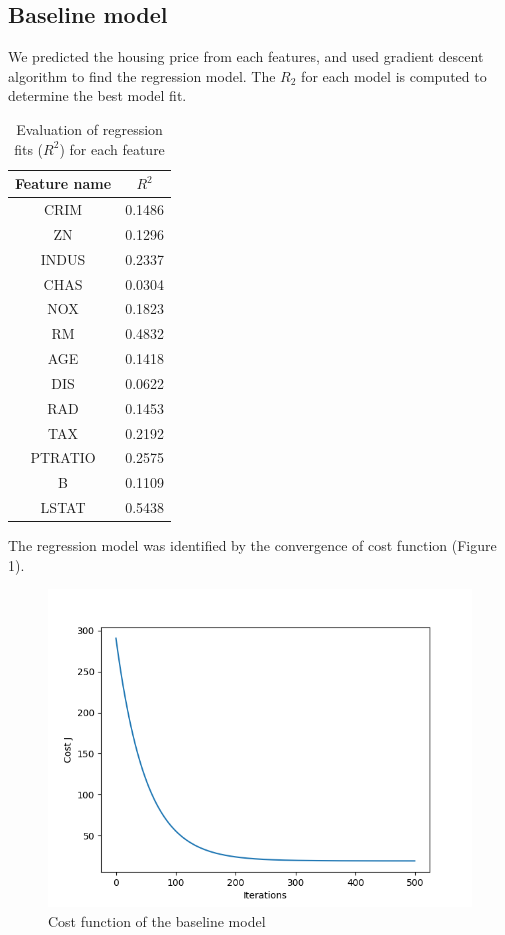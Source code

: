 \documentclass[11pt]{article}
\begin{document}
\subsection{Baseline model}

We predicted the housing price from each features, and used gradient descent algorithm to find the regression model. The $R_{2}$ for each model is computed to determine the best model fit. 
\begin{table}[!htbp]
\small
\centering
\captionsetup{font=scriptsize}
\caption{Evaluation of regression fits ($R^{2}$) for each feature}
\begin{tabular}{|c|c|}
 \hline
Feature name & $R^{2}$ \\
  \hline
CRIM    & 0.1486 \\
ZN      & 0.1296 \\
INDUS   & 0.2337 \\
CHAS    & 0.0304 \\
NOX     & 0.1823 \\
RM      & 0.4832 \\
AGE     & 0.1418 \\
DIS     & 0.0622 \\
RAD     & 0.1453 \\
TAX     & 0.2192 \\
PTRATIO & 0.2575 \\
B       & 0.1109 \\
LSTAT   & 0.5438\\
\hline
\end{tabular}

\label{my-label}
\end{table}

The regression model was identified by the convergence of cost function (Figure 1).
\begin{figure}[!htbp]
 \centering
 \includegraphics[scale = 0.5]{cost_function}
 \captionsetup{font=scriptsize}
  \caption{Cost function of the baseline model}
\end{figure}
\end{document}
